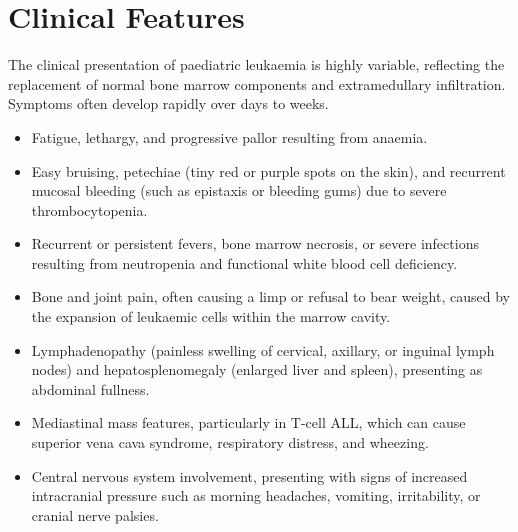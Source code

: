 \section*{Clinical Features}
The clinical presentation of paediatric leukaemia is highly variable, reflecting the replacement of normal bone marrow components and extramedullary infiltration. Symptoms often develop rapidly over days to weeks.
\begin{itemize}
    \item Fatigue, lethargy, and progressive pallor resulting from anaemia.
    \item Easy bruising, petechiae (tiny red or purple spots on the skin), and recurrent mucosal bleeding (such as epistaxis or bleeding gums) due to severe thrombocytopenia.
    \item Recurrent or persistent fevers, bone marrow necrosis, or severe infections resulting from neutropenia and functional white blood cell deficiency.
    \item Bone and joint pain, often causing a limp or refusal to bear weight, caused by the expansion of leukaemic cells within the marrow cavity.
    \item Lymphadenopathy (painless swelling of cervical, axillary, or inguinal lymph nodes) and hepatosplenomegaly (enlarged liver and spleen), presenting as abdominal fullness.
    \item Mediastinal mass features, particularly in T-cell ALL, which can cause superior vena cava syndrome, respiratory distress, and wheezing.
    \item Central nervous system involvement, presenting with signs of increased intracranial pressure such as morning headaches, vomiting, irritability, or cranial nerve palsies.
\end{itemize}

